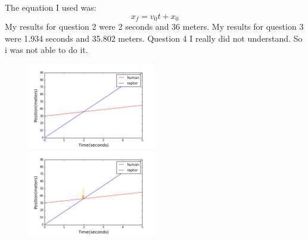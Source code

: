 \documentclass[twocolumn]{revtex4}
\begin{document}
The equation I used was: 
$$x_f = v_0t + x_0$$
My results for question 2 were 2 seconds and 36 meters.
My results for question 3 were 1.934 seconds and 35.802 meters.
Question 4 I really did not understand. So i was not able to do it. 
\begin{figure}[h]

\begin{center}
	\includegraphics[width=0.5\textwidth]{Human_Raptor_Linegraph.png}
	\includegraphics[width=0.5\textwidth]{graph_with_arrow.png}
	
\end{center}

\end{figure}
\pagebreak
\end{document}
